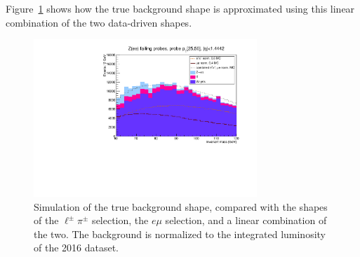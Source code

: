 Figure~\ref{fig:ZeeEPiEMu} shows how the true background shape is approximated using this linear combination of the two data-driven shapes.

\begin{figure}
	\centering
	\includegraphics[width=0.75\textwidth]{figures/ZeeEPiEMu.pdf}
	\caption{Simulation of the true background shape, compared with the shapes of the \ensuremath{\ell^{\pm}\pi^{\pm}} selection, the \ensuremath{e\mu} selection, and a linear combination of the two.
    The background is normalized to the integrated luminosity of the 2016 dataset.}
	\label{fig:ZeeEPiEMu}
\end{figure}
